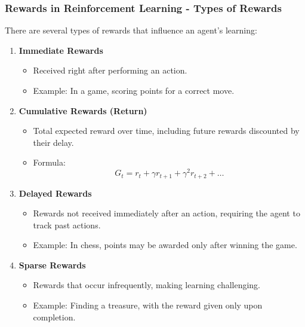 \documentclass[aspectratio=169]{beamer}
\begin{document}
\begin{frame}[fragile]
    \frametitle{Rewards in Reinforcement Learning - Types of Rewards}
    There are several types of rewards that influence an agent's learning:
    \begin{enumerate}
        \item \textbf{Immediate Rewards}
        \begin{itemize}
            \item Received right after performing an action.
            \item Example: In a game, scoring points for a correct move.
        \end{itemize}
        
        \item \textbf{Cumulative Rewards (Return)}
        \begin{itemize}
            \item Total expected reward over time, including future rewards discounted by their delay.
            \item Formula: 
            \begin{equation}
            G_t = r_t + \gamma r_{t+1} + \gamma^2 r_{t+2} + \ldots
            \end{equation}
        \end{itemize}
        
        \item \textbf{Delayed Rewards}
        \begin{itemize}
            \item Rewards not received immediately after an action, requiring the agent to track past actions.
            \item Example: In chess, points may be awarded only after winning the game.
        \end{itemize}
        
        \item \textbf{Sparse Rewards}
        \begin{itemize}
            \item Rewards that occur infrequently, making learning challenging.
            \item Example: Finding a treasure, with the reward given only upon completion.
        \end{itemize}
    \end{enumerate}
\end{frame}
\end{document}
